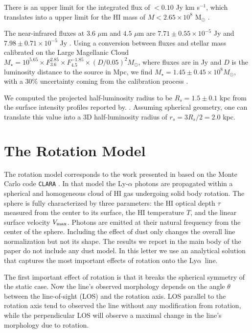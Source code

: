 \documentclass[a4paper, usenatbib, 12pt]{article}
\newcommand{\lya}{Ly$\alpha$}
\begin{document}
{There is an upper limit for the  
integrated flux of $<0.10$ Jy km s$^{-1}$, which translates into a
upper limit for the HI mass of $M<2.65\times 10^{8}$ M$_{\odot}$
\cite{pustilnikmartin07}.  

The near-infrared fluxes at $3.6$ $\mu$m and $4.5$ $\mu$m are
$7.71\pm0.55\times 10^{-5}$ Jy and $7.98\pm0.71\times 10^{-5}$ Jy
\cite{2008ApJ...678..804E}.  Using a conversion between fluxes and
stellar mass calibrated on the Large Magellanic Cloud $M_{\star} =
10^{5.65} \times F_{3.6}^{2.85} \times F_{4.5}^{-1.85} \times
(D/0.05)^2 M_{\odot}$, where fluxes are in Jy and $D$ is the luminosity
distance to the source in Mpc, we find $M_{\star} = 1.45\pm0.45\times 10^{8}
M_{\odot}$, with a $30\%$ uncertainty coming from the calibration
process \cite{2012AJ....143..139E}.  


We computed the projected half-luminosity radius to be $R_s=1.5\pm0.1$ kpc 
from the surface intensity profiles reported by.
\cite{2003A&A...410..481N}. 
Assuming spherical geometry, one can translate this value into a 3D
half-luminosity radius of $r_s=3R_s/2=2.0$ kpc.



\section*{The Rotation Model}

The rotation model corresponds to the work presented in
\cite{GaravitoCamargo2014} based on the Monte Carlo code
\texttt{CLARA} \cite{CLARA}. 
In that model the Ly-$\alpha$ photons are propagated 
within a spherical and homogeneous cloud of HI gas undergoing solid
body rotation.
The sphere is fully characterized by three parameters: the HI optical
depth $\tau$ measured from the center to its surface, the HI
temperature $T$, and the linear surface velocity $V_{\rm max}$.  
Photons are emitted at their natural frequency from the center of the
sphere. 
Including the effect of dust only changes the overall line
normalization but not its shape.  
The results we report in the main body of the paper do not include any
dust model.
In this letter we use an analytical solution that captures the most
important effects of rotation onto the \lya\ line.



The first important effect of rotation is that it breaks the spherical
symmetry of the static case. 
Now the line's observed morphology depends on the angle $\theta$ between the
line-of-sight (LOS) and the rotation axis. 
LOS parallel to the rotation axis tend to observed the line without
any modification from rotation, while the perpendicular LOS will
observe a maximal change in the line's morphology due to rotation.

}
\end{document}
